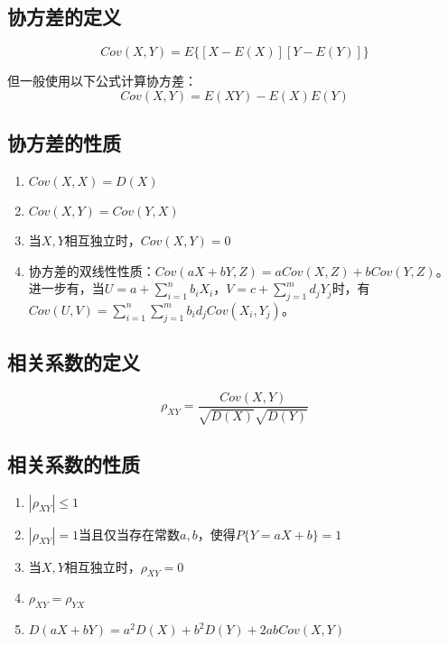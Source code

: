 \documentclass[a4paper,12pt]{ctexart}
\begin{document}
\subsection{协方差的定义}

\begin{equation*}
	Cov(X,Y) = E\{[X - E(X)][Y - E(Y)]\}
\end{equation*}

但一般使用以下公式计算协方差：
\begin{equation*}
	Cov(X,Y) = E(XY) - E(X)E(Y)
\end{equation*}

\subsection{协方差的性质}

\begin{enumerate}
	\item $Cov(X,X) = D(X)$
	\item $Cov(X,Y) = Cov(Y,X)$
	\item 当$X,Y$相互独立时，$Cov(X,Y) = 0$
	\item 协方差的双线性性质：$Cov(aX + bY,Z) = aCov(X,Z) + bCov(Y,Z)$。
	进一步有，当$U = a + \sum_{i=1}^nb_iX_i$，$V = c + \sum_{j=1}^md_jY_j$时，有$Cov(U,V) = \sum_{i=1}^n\sum_{j=1}^mb_id_jCov(X_i,Y_j)$。
\end{enumerate}

\subsection{相关系数的定义}

\begin{equation*}
	\rho_{XY} = \frac{Cov(X,Y)}{\sqrt{D(X)}\sqrt{D(Y)}}
\end{equation*}

\subsection{相关系数的性质}

\begin{enumerate}
	\item $|\rho_{XY}| \leq 1$
	\item $|\rho_{XY}| = 1$当且仅当存在常数$a,b$，使得$P\{Y = aX + b\} = 1$
	\item 当$X,Y$相互独立时，$\rho_{XY} = 0$
	\item $\rho_{XY} = \rho_{YX}$
	\item $D(aX + bY) = a^2D(X) + b^2D(Y) + 2abCov(X,Y)$
\end{enumerate}
\end{document}
